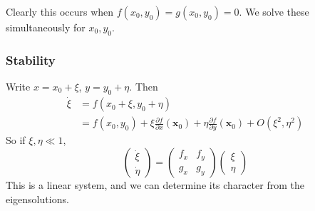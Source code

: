 \documentclass[a4paper]{article}
\theoremstyle{definition}
\newcommand{\mb}[1]{\mathbf{#1}}
\begin{document}
Clearly this occurs when $f(x_0, y_0) = g(x_0, y_0) = 0$. We solve these simultaneously for $x_0, y_0$.

\subsubsection{Stability}
Write $x = x_0 + \xi$, $y = y_0 + \eta$. Then
\begin{align*}
  \dot \xi &= f(x_0 + \xi, y_0 + \eta)\\
  &= f(x_0, y_0)+ \xi \frac{\partial f}{\partial x}(\mb{x}_0) + \eta \frac{\partial f}{\partial y}(\mb{x}_0) + O(\xi^2, \eta^2)
\end{align*}
So if $\xi, \eta \ll 1$, 
\[
\begin{pmatrix}
  \dot \xi\\\dot \eta
\end{pmatrix} = 
\begin{pmatrix}
  f_x & f_y\\
  g_x & g_y
\end{pmatrix}
\begin{pmatrix}
  \xi\\\eta
\end{pmatrix}
\]
This is a linear system, and we can determine its character from the eigensolutions. 
\end{document}

